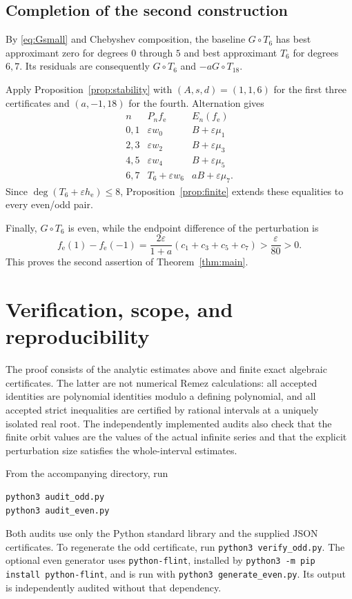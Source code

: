 \documentclass[11pt]{article}
\theoremstyle{remark}\newtheorem{remark}[theorem]{Remark}
\newcommand{\eps}{\varepsilon}
\begin{document}
\subsection{Completion of the second construction}

By \eqref{eq:Gsmall} and Chebyshev composition, the baseline
$G\circ T_6$ has best approximant zero for degrees $0$ through $5$ and
best approximant $T_6$ for degrees $6,7$. Its residuals are consequently
$G\circ T_6$ and $-aG\circ T_{18}$.

Apply Proposition~\ref{prop:stability} with
$(A,s,d)=(1,1,6)$ for the first three certificates and
$(a,-1,18)$ for the fourth. Alternation gives
\[
\begin{array}{c|c|c}
 n&P_n f_{\mathrm{e}}&E_n(f_{\mathrm{e}})\\\hline
 0,1&\eps w_0&B+\eps\mu_1\\
 2,3&\eps w_2&B+\eps\mu_3\\
 4,5&\eps w_4&B+\eps\mu_5\\
 6,7&T_6+\eps w_6&aB+\eps\mu_7.
\end{array}
\]
Since $\deg(T_6+\eps h_{\mathrm{e}})\le8$,
Proposition~\ref{prop:finite} extends these equalities to every even/odd
pair.

Finally, $G\circ T_6$ is even, while the endpoint difference of the
perturbation is
\begin{equation}\label{eq:evenwitness}
 f_{\mathrm{e}}(1)-f_{\mathrm{e}}(-1)
 =\frac{2\eps}{1+a}(c_1+c_3+c_5+c_7)
 >\frac{\eps}{80}>0.
\end{equation}
This proves the second assertion of Theorem~\ref{thm:main}.

\section{Verification, scope, and reproducibility}

The proof consists of the analytic estimates above and finite exact
algebraic certificates. The latter are not numerical Remez calculations:
all accepted identities are polynomial identities modulo a defining
polynomial, and all accepted strict inequalities are certified by rational
intervals at a uniquely isolated real root. The independently implemented
audits also check that the finite orbit values are the values of the
actual infinite series and that the explicit perturbation size satisfies
the whole-interval estimates.

From the accompanying directory, run
\begin{verbatim}
python3 audit_odd.py
python3 audit_even.py
\end{verbatim}
Both audits use only the Python standard library and the supplied JSON
certificates. To regenerate the odd certificate, run
\texttt{python3 verify\_odd.py}. The optional even generator uses
\texttt{python-flint}, installed by
\texttt{python3 -m pip install python-flint}, and is run with
\texttt{python3 generate\_even.py}. Its output is independently audited
without that dependency.
\end{document}
